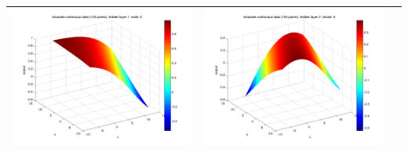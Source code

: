 \documentclass[fleqn]{article}
\begin{document}
\begin{center}
\begin{longtable}{ c | c | r }
    \includegraphics[scale=0.25]{./pics/bivariate100/_2_4/_2_4_epoch_100_hidden layer 1 :2} &   \includegraphics[scale=0.25]{./pics/bivariate100/_2_4/_2_4_epoch_100_hidden layer 2 :24} & \\
   \hline
  \end{longtable}
\end{center}
\end{document}
